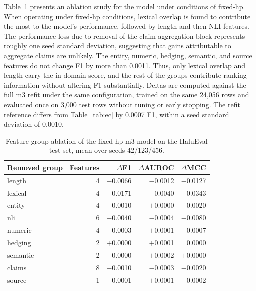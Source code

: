 \documentclass[a4paper,fleqn]{cas-sc}
\begin{document}
Table~\ref{tab:ablation} presents an ablation study for the model under conditions of fixed-hp. When operating under fixed-hp conditions, lexical overlap is found to contribute the most to the model's performance, followed by length and then NLI features. The performance loss due to removal of the claim aggregation block represents roughly one seed standard deviation, suggesting that gains attributable to aggregate claims are unlikely. The entity, numeric, hedging, semantic, and source features do not change F1 by more than 0.0011. Thus, only lexical overlap and length carry the in-domain score, and the rest of the groups contribute ranking information without altering F1 substantially. Deltas are computed against the full m3 refit under the same configuration, trained on the same 24{,}056 rows and evaluated once on 3{,}000 test rows without tuning or early stopping. The refit reference differs from Table~\ref{tab:ec} by 0.0007 F1, within a seed standard deviation of 0.0010.

\begin{table}[H]
  \centering
  \caption{Feature-group ablation of the fixed-hp m3 model on the HaluEval test set, mean over seeds 42/123/456.}
  \label{tab:ablation}
  \begin{tabular}{lrrrr}
    \toprule
    \textbf{Removed group} & \textbf{Features} & \textbf{$\Delta$F1} & \textbf{$\Delta$AUROC} & \textbf{$\Delta$MCC} \\
    \midrule
    length                 & 4                 & $-$0.0066           & $-$0.0012              & $-$0.0127            \\
    lexical                & 4                 & $-$0.0171           & $-$0.0040              & $-$0.0343            \\
    entity                 & 4                 & $-$0.0010           & $+$0.0000              & $-$0.0020            \\
    nli                    & 6                 & $-$0.0040           & $-$0.0004              & $-$0.0080            \\
    numeric                & 4                 & $-$0.0003           & $+$0.0001              & $-$0.0007            \\
    hedging                & 2                 & $+$0.0000           & $+$0.0001              & 0.0000               \\
    semantic               & 2                 & 0.0000              & $+$0.0002              & $+$0.0000            \\
    claims                 & 8                 & $-$0.0010           & $-$0.0003              & $-$0.0020            \\
    source                 & 1                 & $-$0.0001           & $+$0.0001              & $-$0.0002            \\
    \bottomrule
  \end{tabular}
\end{table}
\end{document}
